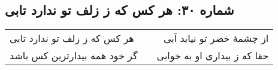 \begin{center}
\section*{شماره ۳۰: هر کس که ز زلف تو ندارد تابی}
\label{sec:030}
\begin{longtable}{l p{0.5cm} r}
هر کس که ز زلف تو ندارد تابی
&&
از چشمهٔ خضر تو نیابد آبی
\\
گر خود همه بیدارترین کس باشد
&&
حقا که ز بیداری او به خوابی
\\
\end{longtable}
\end{center}
